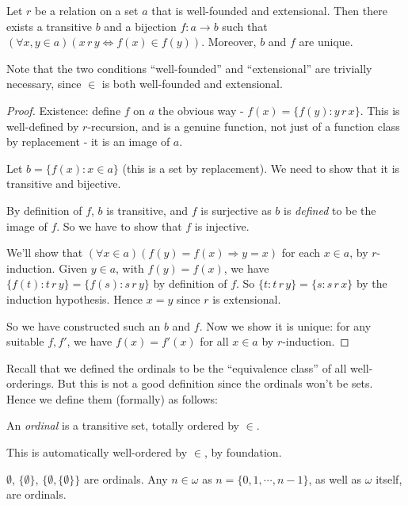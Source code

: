 \documentclass[a4paper]{article}
\begin{document}
\begin{thm}
  Let $r$ be a relation on a set $a$ that is well-founded and extensional. Then there exists a transitive $b$ and a bijection $f: a \to b$ such that $(\forall x, y\in a)(x\, r\, y\Leftrightarrow f(x) \in f(y))$. Moreover, $b$ and $f$ are unique.
\end{thm}
Note that the two conditions ``well-founded'' and ``extensional'' are trivially necessary, since $\in$ is both well-founded and extensional.

\begin{proof}
  Existence: define $f$ on $a$ the obvious way - $f(x) = \{f(y): y\,r\,x\}$. This is well-defined by $r$-recursion, and is a genuine function, not just of a function class by replacement - it is an image of $a$.

  Let $b = \{f(x): x\in a\}$ (this is a set by replacement). We need to show that it is transitive and bijective.

  By definition of $f$, $b$ is transitive, and $f$ is surjective as $b$ is \emph{defined} to be the image of $f$.  So we have to show that $f$ is injective.

  We'll show that $(\forall x\in a)(f(y) = f(x) \Rightarrow  y = x)$ for each $x\in a$, by $r$-induction. Given $y\in a$, with $f(y) = f(x)$, we have $\{f(t): t\,r\, y\} = \{f(s): s\,r\,y\}$ by definition of $f$. So $\{t: t\,r \, y\}=\{s: s\,r \, x\}$ by the induction hypothesis. Hence $x = y$ since $r$ is extensional.

  So we have constructed such an $b$ and $f$. Now we show it is unique: for any suitable $f, f'$, we have $f(x) = f'(x)$ for all $x\in a$ by $r$-induction.
\end{proof}

Recall that we defined the ordinals to be the ``equivalence class'' of all well-orderings. But this is not a good definition since the ordinals won't be sets. Hence we define them (formally) as follows:
\begin{defi}[Ordinal]
  An \emph{ordinal} is a transitive set, totally ordered by $\in$.
\end{defi}
This is automatically well-ordered by $\in$, by foundation.

\begin{eg}
  $\emptyset$, $\{\emptyset\}$, $\{\emptyset, \{\emptyset\}\}$ are ordinals. Any $n\in \omega$ as $n = \{0, 1, \cdots, n - 1\}$, as well as $\omega$ itself, are ordinals.
\end{eg}
\end{document}
